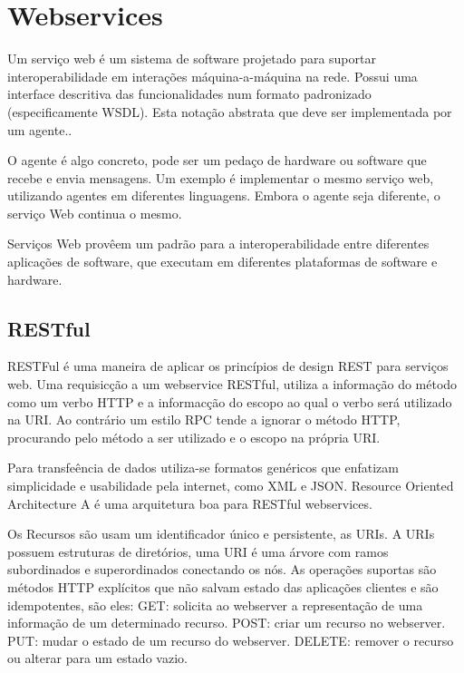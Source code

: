 
\section{Webservices}

Um servi\c{c}o web \'e um sistema de software projetado para suportar interoperabilidade em intera\c{c}\~oes m\'aquina-a-m\'aquina na rede. Possui uma interface descritiva das funcionalidades num formato padronizado (especificamente WSDL). Esta nota\c{c}\~ao abstrata que deve ser implementada por um agente.\cite{w3c-web-04}. 

O agente \'e algo concreto, pode ser um peda\c{c}o de hardware ou software que recebe e envia mensagens. Um exemplo \'e implementar o mesmo servi\c{c}o web, utilizando agentes em diferentes linguagens. Embora o agente seja diferente, o servi\c{c}o Web continua o mesmo.

Servi\c{c}os Web prov\^eem um padr\~ao para a interoperabilidade entre diferentes aplica\c{c}\~oes de software, que executam em diferentes plataformas de software e hardware.

\subsection{RESTful}

RESTFul \'e uma maneira de aplicar os princ\'ipios de design REST para servi\c{c}os web. Uma requisic\c{c}\~ao a um webservice RESTful, utiliza a informa\c{c}\~ao do m\'etodo como um verbo HTTP e a informac\c{c}\~ao do escopo ao qual o verbo ser\'a utilizado na URI. Ao contr\'ario um estilo RPC tende a ignorar o m\'etodo HTTP, procurando pelo m\'etodo a ser utilizado e o escopo na pr\'opria URI. \cite{rest}

Para transfe\^encia de dados utiliza-se formatos gen\'ericos que enfatizam simplicidade e usabilidade pela internet, como XML e JSON. Resource Oriented Architecture A \'e uma arquitetura boa para RESTful webservices. \cite{richardson2008restful}

Os Recursos s\~ao usam um identificador \'unico e persistente, as URIs. A URIs possuem estruturas de diret\'orios, uma URI \'e uma \'arvore com ramos subordinados e superordinados conectando os n\'os. As opera\c{c}\~oes suportas s\~ao m\'etodos HTTP expl\'icitos que n\~ao salvam estado das aplica\c{c}\~oes clientes e s\~ao idempotentes, s\~ao eles:
GET: solicita ao webserver a representa\c{c}\~ao de uma informa\c{c}\~ao de um determinado recurso.
POST: criar um recurso no webserver.
PUT: mudar o estado de um recurso do webserver.
DELETE: remover o recurso ou alterar para um estado vazio.

